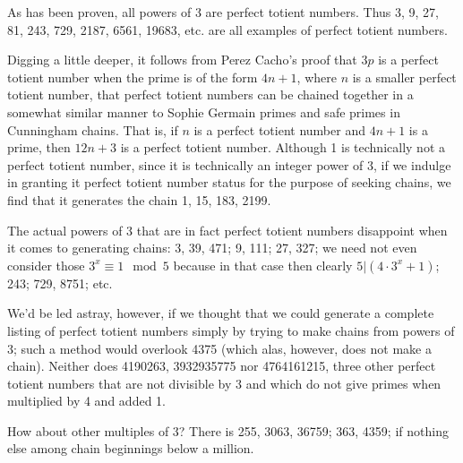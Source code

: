 \documentclass[12pt]{article}
\begin{document}
As has been proven, all powers of 3 are perfect totient numbers. Thus 3, 9, 27, 81, 243, 729, 2187, 6561, 19683, etc. are all examples of perfect totient numbers.

Digging a little deeper, it follows from Perez Cacho's proof that $3p$ is a perfect totient number when the prime is of the form $4n + 1$, where $n$ is a smaller perfect totient number, that perfect totient numbers can be chained together in a somewhat similar manner to Sophie Germain primes and safe primes in Cunningham chains. That is, if $n$ is a perfect totient number and $4n + 1$ is a prime, then $12n + 3$ is a perfect totient number. Although 1 is technically not a perfect totient number, since it is technically an integer power of 3, if we indulge in granting it perfect totient number status for the purpose of seeking chains, we find that it generates the chain 1, 15, 183, 2199.

The actual powers of 3 that are in fact perfect totient numbers disappoint when it comes to generating chains: 3, 39, 471; 9, 111; 27, 327; we need not even consider those $3^x \equiv 1 \mod 5$ because in that case then clearly $5|(4 \cdot 3^x + 1)$; 243; 729, 8751; etc.

We'd be led astray, however, if we thought that we could generate a complete listing of perfect totient numbers simply by trying to make chains from powers of 3; such a method would overlook 4375 (which alas, however, does not make a chain). Neither does 4190263, 3932935775 nor 4764161215, three other perfect totient numbers that are not divisible by 3 and which do not give primes when multiplied by 4 and added 1.

How about other multiples of 3? There is 255, 3063, 36759; 363, 4359; if nothing else among chain beginnings below a million.
\end{document}
